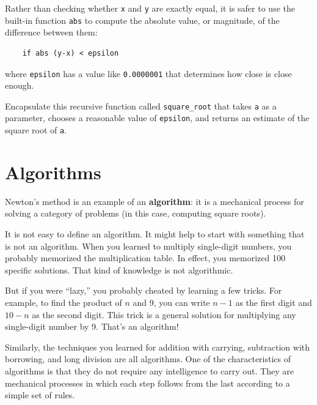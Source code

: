 \documentclass[10pt]{book}
\begin{document}

Rather than checking whether {\tt x} and {\tt y} are exactly equal, it
is safer to use the built-in function {\tt abs} to compute the
absolute value, or magnitude, of the difference between them:

\beforeverb
\begin{verbatim}
    if abs (y-x) < epsilon
\end{verbatim}
\afterverb
where \verb"epsilon" has a value like {\tt 0.0000001} that
determines how close is close enough.

\begin{ex}
\label{square_root}

Encapsulate this recursive function called \verb"square_root"
that takes {\tt a} as a parameter, chooses a reasonable
value of {\tt epsilon}, and returns an estimate of the square root
of {\tt a}.
\end{ex}

\section{Algorithms}

Newton's method is an example of an {\bf algorithm}: it is a
mechanical process for solving a category of problems (in this
case, computing square roots).

It is not easy to define an algorithm.  It might help to start
with something that is not an algorithm.  When you learned
to multiply single-digit numbers, you probably memorized the
multiplication table.  In effect, you memorized 100 specific solutions.
That kind of knowledge is not algorithmic.

But if you were ``lazy,'' you probably cheated by learning a few
tricks.  For example, to find the product of $n$ and 9, you can
write $n-1$ as the first digit and $10-n$ as the second
digit.  This trick is a general solution for multiplying any
single-digit number by 9.  That's an algorithm!


Similarly, the techniques you learned for addition with carrying,
subtraction with borrowing, and long division are all algorithms.  One
of the characteristics of algorithms is that they do not require any
intelligence to carry out.  They are mechanical processes in which
each step follows from the last according to a simple set of rules.
\end{document}
